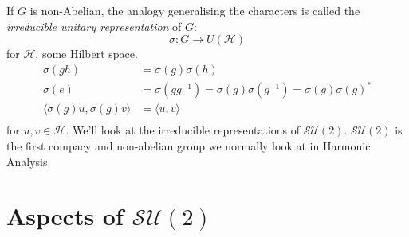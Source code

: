 \documentclass{article}
\begin{document}
If $G$ is non-Abelian, the analogy generalising the characters is called the \textit{irreducible unitary representation} of $G$:
\begin{equation}
    \sigma : G \rightarrow U(\mathcal{H})
\end{equation}
for $\mathcal{H}$, some Hilbert space. 
\begin{equation}
    \begin{split}
        \sigma(gh) &= \sigma(g)\sigma(h) \\
        \sigma(e) &= \sigma(g g^{-1}) = \sigma(g)\sigma(g^{-1}) = \sigma(g)\sigma(g)^{*} \\
        \langle \sigma(g)u, \sigma(g)v \rangle &= \langle u,v \rangle \\
    \end{split}
\end{equation}
for $u,v \in \mathcal{H}$. We'll look at the irreducible representations of $\mathcal{SU}(2)$. $\mathcal{SU}(2)$ is the first compacy and non-abelian group we normally look at in Harmonic Analysis. 

\section{Aspects of $\mathcal{SU}(2)$} 
\end{document}
